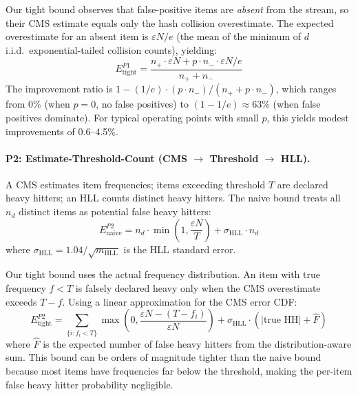 \documentclass[preprint]{article}
\newcommand{\HLL}{\textrm{HLL}}
\begin{document}
Our tight bound observes that false-positive items are \emph{absent} from the stream, so their CMS estimate equals only the hash collision overestimate. The expected overestimate for an absent item is $\varepsilon N / e$ (the mean of the minimum of $d$ i.i.d.\ exponential-tailed collision counts), yielding:
\begin{equation}
\label{eq:p1_tight}
E_{\text{tight}}^{P1} = \frac{n_+ \cdot \varepsilon N + p \cdot n_- \cdot \varepsilon N / e}{n_+ + n_-}
\end{equation}
The improvement ratio is $1 - (1/e) \cdot (p \cdot n_-)/(n_+ + p \cdot n_-)$, which ranges from 0\% (when $p=0$, no false positives) to $(1-1/e) \approx 63\%$ (when false positives dominate). For typical operating points with small $p$, this yields modest improvements of 0.6--4.5\%.

\paragraph{P2: Estimate-Threshold-Count (CMS $\to$ Threshold $\to$ HLL).}
A CMS estimates item frequencies; items exceeding threshold $T$ are declared heavy hitters; an HLL counts distinct heavy hitters. The naive bound treats all $n_d$ distinct items as potential false heavy hitters:
\begin{equation}
E_{\text{naive}}^{P2} = n_d \cdot \min\!\left(1, \frac{\varepsilon N}{T}\right) + \sigma_{\HLL} \cdot n_d
\end{equation}
where $\sigma_{\HLL} = 1.04/\sqrt{m_{\HLL}}$ is the HLL standard error.

Our tight bound uses the actual frequency distribution. An item with true frequency $f < T$ is falsely declared heavy only when the CMS overestimate exceeds $T - f$. Using a linear approximation for the CMS error CDF:
\begin{equation}
\label{eq:p2_tight}
E_{\text{tight}}^{P2} = \sum_{\{i : f_i < T\}} \max\!\left(0, \frac{\varepsilon N - (T - f_i)}{\varepsilon N}\right) + \sigma_{\HLL} \cdot (|\text{true HH}| + \hat{F})
\end{equation}
where $\hat{F}$ is the expected number of false heavy hitters from the distribution-aware sum. This bound can be orders of magnitude tighter than the naive bound because most items have frequencies far below the threshold, making the per-item false heavy hitter probability negligible.
\end{document}
